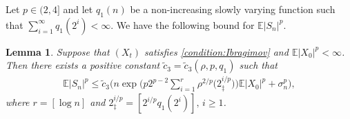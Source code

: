\documentclass[11pt,a4,leqno]{amsart}
\newtheorem{lemma}{Lemma}[section]
\newcommand{\wt}{\widetilde}
\newcommand{\E }{{\mathbb E}}
\newcommand{\1}{{\mathbf 1}}
\begin{document}
Let $p\in (2,4]$ and let $q_1 (n)$ be a non-increasing slowly varying function such that $\sum_{i=1}^\infty q_1 (2^i)<\infty$. 
We have the following bound for $\E|S_n|^p$.

\begin{lemma}
\label{lem:inq:4th:moment}
 Suppose that $(X_t)$ satisfies \eqref{condition:Ibragimov} and $\E|X_0|^p<\infty$. 
Then there exists a positive constant $\wt c_3=\wt c_3 (\rho,p,q_1)$ such that 
\begin{align}
\label{inq:4th:moment}
 \E|S_n|^p \le \wt c_3 \bigg(n \exp\Big( p 2^{p-2}
\sum_{i=1}^r \rho^{2/p}\big( 2_\ddag^{i/p} \big)
\Big)\E|X_0|^p+ \sigma_n^p \bigg),
\end{align}
where $r=[\log n]$ and $2_\ddag^{i/p}=[2^{i/p} q_1(2^i)],\,i\ge 1$. 
\end{lemma}
\end{document}
